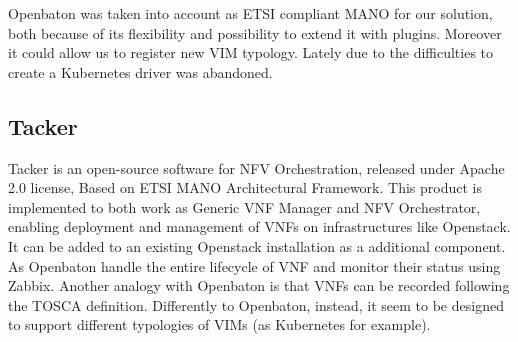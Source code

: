 Openbaton was taken into account as ETSI compliant MANO for our solution, both
because of its flexibility and possibility to extend it with plugins. Moreover
it could allow us to register new VIM typology. Lately due to the difficulties
to create a Kubernetes driver was abandoned.


\subsection{Tacker}
Tacker is an open-source software for NFV Orchestration, released under Apache
2.0 license, Based on ETSI MANO Architectural Framework. This product is
implemented to both work as Generic VNF Manager and NFV Orchestrator, enabling
deployment and management of VNFs on infrastructures like Openstack. It can be
added to an existing Openstack installation as a additional component. As
Openbaton handle the entire lifecycle of VNF and monitor their status using
Zabbix. Another analogy with Openbaton is that VNFs can be recorded following
the TOSCA definition. Differently to Openbaton, instead, it seem to be designed
to support different typologies of VIMs (as Kubernetes for example). 
